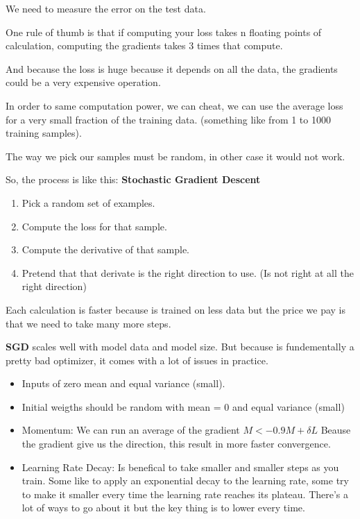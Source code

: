 \documentclass[11pt, a4paper]{article}
\begin{document}
We need to measure the error on the test data. 

One rule of thumb is that if computing your loss takes n floating points of calculation, computing the gradients takes 3 times that compute. 

And because the loss is huge because it depends on all the data, the gradients could be a very expensive operation. 

In order to same computation power, we can cheat, we can use the average loss for a very small fraction of the training data. (something like from 1 to 1000 training samples). 

The way we pick our samples must be random, in other case it would not work. 

So, the process is like this: \textbf{Stochastic Gradient Descent} 
\begin{enumerate}
	\item Pick a random set of examples. 
	\item Compute the loss for that sample.
	\item Compute the derivative of that sample.
	\item Pretend that that derivate is the right direction to use. (Is not right at all the right direction)
\end{enumerate}

Each calculation is faster because is trained on less data but the price we pay is that we need to take many more steps. 

\textbf{SGD} scales well with model data and model size. But because is fundementally a pretty bad optimizer, it comes with a lot of issues in practice. 


\begin{itemize}
	Tricks to help \textbf{SGD} 
\item Inputs of zero mean and equal variance (small).
\item Initial weigths should be random with mean = 0 and equal variance (small)
\item Momentum: We can run an average of the gradient $M <- 0.9M + \delta L$  Beause the gradient give us the direction, this result in more faster convergence. 
\item Learning Rate Decay: Is benefical to take smaller and smaller steps as you train. Some like to apply an exponential decay to the learning rate, some try to make it smaller every time the learning rate reaches its plateau. There's a lot of ways to go about it but the key thing is to lower every time.
\end{itemize}
\end{document}
